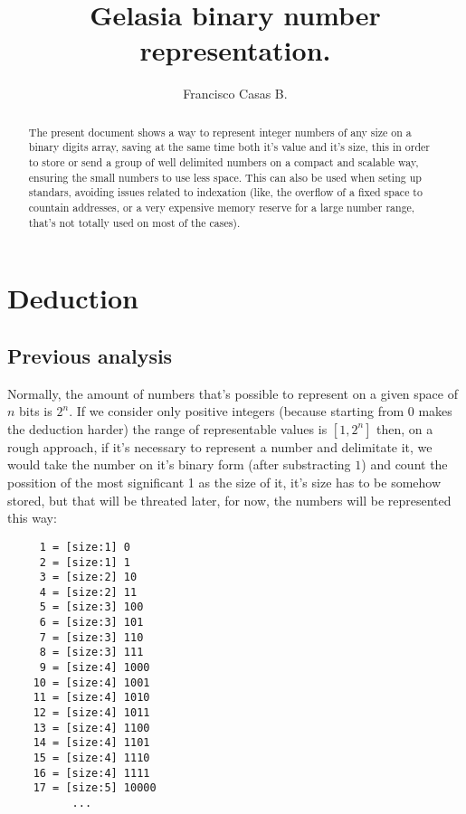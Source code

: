 \documentclass[a4paper,11pt]{article}
\title{Gelasia binary number representation.}
\author{Francisco Casas B.}
\begin{document}
\maketitle

\begin{abstract}
The present document shows a way to represent integer numbers of any size on a binary digits array, saving at the same time both it's value and it's size, this in order to store or send a group of well delimited numbers on a compact and scalable way, ensuring the small numbers to use less space. This can also be used when seting up standars, avoiding issues related to indexation (like, the overflow of a fixed space to countain addresses, or a very expensive memory reserve for a large number range, that's not totally used on most of the cases).
\end{abstract}

\tableofcontents

\section{Deduction}
\subsection{Previous analysis}
Normally, the amount of numbers that's possible to represent on a given space of $n$ bits is $2^n$. If we consider only positive integers (because starting from $0$ makes the deduction harder) the range of representable values is $[1,2^n]$ then, on a rough approach, if it's necessary to represent a number and delimitate it, we would take the number on it's binary form (after substracting $1$) and count the possition of the most significant 1 as the size of it, it's size has to be somehow stored, but that will be threated later, for now, the numbers will be represented this way:
\begin{center} \begin{lstlisting}
	 1 = [size:1] 0
	 2 = [size:1] 1
	 3 = [size:2] 10
	 4 = [size:2] 11
	 5 = [size:3] 100
	 6 = [size:3] 101
	 7 = [size:3] 110
	 8 = [size:3] 111
	 9 = [size:4] 1000
	10 = [size:4] 1001
	11 = [size:4] 1010
	12 = [size:4] 1011
	13 = [size:4] 1100
	14 = [size:4] 1101
	15 = [size:4] 1110
	16 = [size:4] 1111
	17 = [size:5] 10000
	      ...
\end{lstlisting} \end{center}
\end{document}
